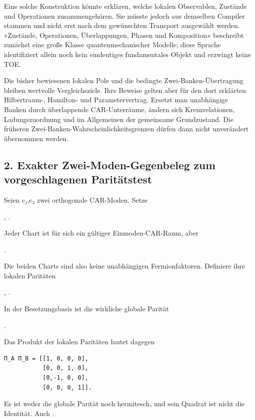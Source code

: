 Eine solche Konstruktion könnte erklären, welche lokalen Observablen,
Zustände und Operationen zusammengehören. Sie müsste jedoch aus
demselben Compiler stammen und nicht erst nach dem gewünschten Transport
ausgewählt werden. »Zustände, Operationen, Überlappungen, Phasen und
Komposition« beschreibt zunächst eine große Klasse quantenmechanischer
Modelle; diese Sprache identifiziert allein noch kein eindeutiges
fundamentales Objekt und erzwingt keine TOE.

Die bisher bewiesenen lokalen Pole und die bedingte
Zwei-Banken-Übertragung bleiben wertvolle Vergleichsziele. Ihre Beweise
gelten aber für den dort erklärten Hilbertraum-, Hamilton- und
Parametervertrag. Ersetzt man unabhängige Banken durch überlappende
CAR-Unterräume, ändern sich Kreuzrelationen, Ladungszuordnung und im
Allgemeinen der gemeinsame Grundzustand. Die früheren
Zwei-Banken-Wahrscheinlichkeitsgrenzen dürfen dann nicht unverändert
übernommen werden.

\subsection{2. Exakter Zwei-Moden-Gegenbeleg zum vorgeschlagenen
Paritätstest}\label{exakter-zwei-moden-gegenbeleg-zum-vorgeschlagenen-parituxe4tstest}

Seien c₁,c₂ zwei orthogonale CAR-Moden. Setze

, .

Jeder Chart ist für sich ein gültiger Einmoden-CAR-Raum, aber

.

Die beiden Charts sind also keine unabhängigen Fermionfaktoren.
Definiere ihre lokalen Paritäten

, .

In der Besetzungsbasis  ist die wirkliche
globale Parität

.

Das Produkt der lokalen Paritäten lautet dagegen

\begin{verbatim}
Π_A Π_B = [[1, 0, 0, 0],
           [0, 0, 1, 0],
           [0,-1, 0, 0],
           [0, 0, 0, 1]].
\end{verbatim}

Es ist weder die globale Parität noch hermitesch, und sein Quadrat ist
nicht die Identität. Auch .

